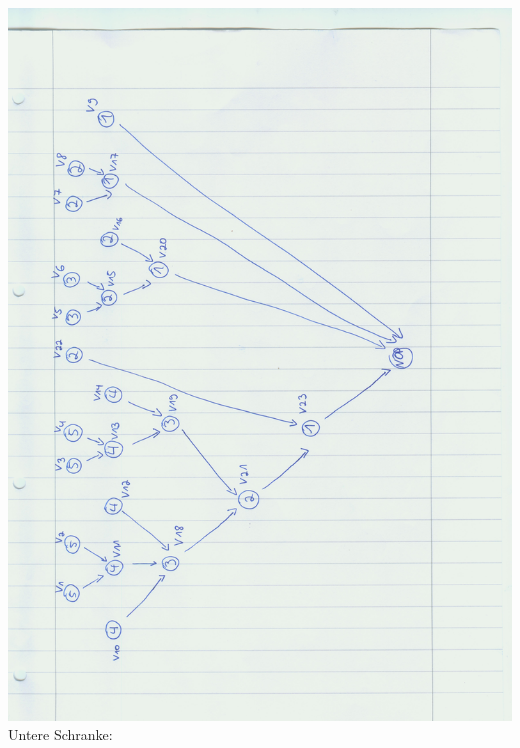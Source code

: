 \documentclass[a4paper]{scrartcl}
\begin{document}
\begin{enumerate}[(a)]
	\includegraphics[scale=0.5, angle = -90]{Image126}
	\newpage
	Untere Schranke:
	

\end{enumerate}
\end{document}

